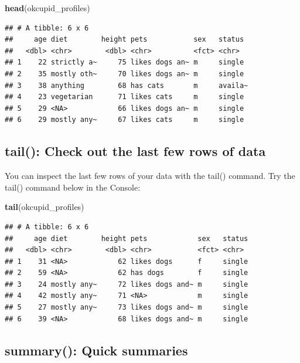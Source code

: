 \documentclass[
]{krantz}
\makeatletter
\newenvironment{Shaded}{\begin{snugshade}}{\end{snugshade}}
\newcommand{\KeywordTok}[1]{\textcolor[rgb]{0.27,0.27,0.27}{\textbf{#1}}}
\newcommand{\NormalTok}[1]{#1}
\newenvironment{kframe}{%
\medskip{}
\setlength{\fboxsep}{.8em}
 \def\at@end@of@kframe{}%
 \ifinner\ifhmode%
  \def\at@end@of@kframe{\end{minipage}}%
  \begin{minipage}{\columnwidth}%
 \fi\fi%
 \def\FrameCommand##1{\hskip\@totalleftmargin \hskip-\fboxsep
 \colorbox{shadecolor}{##1}\hskip-\fboxsep
     \hskip-\linewidth \hskip-\@totalleftmargin \hskip\columnwidth}%
 \MakeFramed {\advance\hsize-\width
   \@totalleftmargin\z@ \linewidth\hsize
   \@setminipage}}%
 {\par\unskip\endMakeFramed%
 \at@end@of@kframe}
\renewenvironment{Shaded}{\begin{kframe}}{\end{kframe}}
\makeatother
\begin{document}
\begin{Shaded}
\begin{Highlighting}[]
\KeywordTok{head}\NormalTok{(okcupid_profiles)}
\end{Highlighting}
\end{Shaded}

\begin{verbatim}
## # A tibble: 6 x 6
##     age diet        height pets           sex   status 
##   <dbl> <chr>        <dbl> <chr>          <fct> <chr>  
## 1    22 strictly a~     75 likes dogs an~ m     single 
## 2    35 mostly oth~     70 likes dogs an~ m     single 
## 3    38 anything        68 has cats       m     availa~
## 4    23 vegetarian      71 likes cats     m     single 
## 5    29 <NA>            66 likes dogs an~ m     single 
## 6    29 mostly any~     67 likes cats     m     single
\end{verbatim}

\hypertarget{tail-check-out-the-last-few-rows-of-data}{%
\subsection{tail(): Check out the last few rows of data}\label{tail-check-out-the-last-few-rows-of-data}}

You can inspect the last few rows of your data with the tail() command. Try the tail() command below in the Console:

\begin{Shaded}
\begin{Highlighting}[]
\KeywordTok{tail}\NormalTok{(okcupid_profiles)}
\end{Highlighting}
\end{Shaded}

\begin{verbatim}
## # A tibble: 6 x 6
##     age diet        height pets            sex   status
##   <dbl> <chr>        <dbl> <chr>           <fct> <chr> 
## 1    31 <NA>            62 likes dogs      f     single
## 2    59 <NA>            62 has dogs        f     single
## 3    24 mostly any~     72 likes dogs and~ m     single
## 4    42 mostly any~     71 <NA>            m     single
## 5    27 mostly any~     73 likes dogs and~ m     single
## 6    39 <NA>            68 likes dogs and~ m     single
\end{verbatim}

\hypertarget{summary-quick-summaries}{%
\subsection{summary(): Quick summaries}\label{summary-quick-summaries}}
\end{document}
